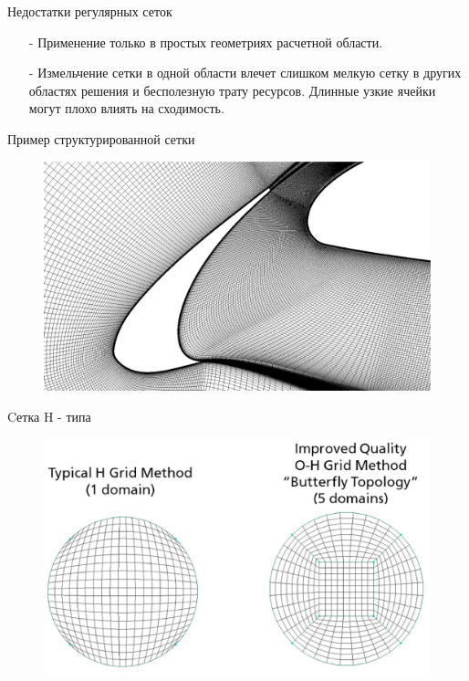 \documentclass[10pt,xcolor=pst,aspectratio=169]{beamer}
\begin{document}
\begin{frame}{Недостатки регулярных сеток}

	\transdissolve[duration=0.1]
	\justifying
	\large

	\begin{itemize}
		\justifying
		\item[-] Применение только в простых геометриях расчетной области.
		\item[-] Измельчение сетки в одной области влечет слишком мелкую сетку в других областях решения и бесполезную трату ресурсов. Длинные узкие ячейки могут плохо влиять на сходимость.
	\end{itemize}

\end{frame}

\begin{frame}{Пример структурированной сетки}

	\transdissolve[duration=0.1]
	\justifying
	\large

	\begin{figure}
		\includegraphics[width=0.8\linewidth]{structured_grid_example.eps}
	\end{figure}

\end{frame}

\begin{frame}{Cетка H - типа}

	\transdissolve[duration=0.1]
	\justifying
	\large

	\begin{figure}
		\includegraphics[width=0.8\linewidth]{H_type_grid_example.eps}
	\end{figure}

\end{frame}
\end{document}
